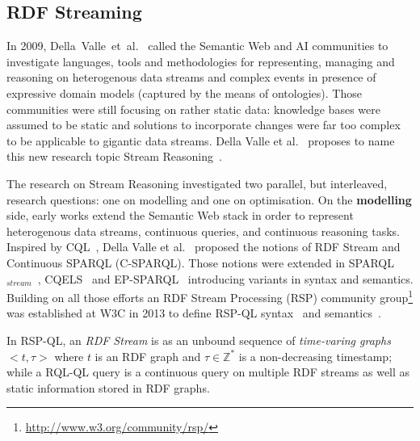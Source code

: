 \subsection{RDF Streaming}\label{sec:rdf} %


In 2009, Della~Valle~et~al.~\cite{DBLP:journals/expert/ValleCHF09} called the Semantic Web and AI communities to investigate languages, tools and methodologies for representing, managing and reasoning on heterogenous data streams and complex events in presence of expressive domain models (captured by the means of ontologies). Those communities were still focusing on rather static data: knowledge bases were assumed to be static and solutions to incorporate changes were far too complex to be applicable to gigantic data streams. Della Valle et al.~\cite{DBLP:journals/expert/ValleCHF09} proposes to name this new research topic Stream Reasoning~\cite{DellAglioDataScience2017}.

\sloppy The research on Stream Reasoning investigated two parallel, but interleaved, research questions: one on modelling and one on optimisation. On the \textbf{modelling} side, early works extend the Semantic Web stack \cite{DBLP:books/daglib/0036180} in order to represent heterogenous data streams, continuous queries, and continuous reasoning tasks. Inspired by CQL~\cite{arasu_widom_2004}, Della Valle et al.~\cite{DBLP:conf/fis/ValleCBBC08} proposed the notions of RDF Stream and Continuous SPARQL (C-SPARQL). Those notions were extended in SPARQL$_{stream}$~\cite{Calbimonte2010}, CQELS~\cite{LePhuoc2012c} and EP-SPARQL~\cite{DBLP:journals/semweb/AnicicRFS12} introducing variants in syntax and semantics. Building on all those efforts an RDF Stream Processing (RSP) community group\footnote{\url{http://www.w3.org/community/rsp/}} was established at W3C in 2013  to define RSP-QL syntax~\cite{DBLP:conf/esws/DellAglioCVC15} and semantics~\cite{DBLP:journals/ijswis/DellAglioVCC14}.

In RSP-QL, an \textit{RDF Stream} is as an unbound sequence of \emph{time-varing graphs} $< t,\tau>$ where $t$ is an RDF graph and $\tau \in \mathbb{Z}^{*}$ is a non-decreasing timestamp; while a RQL-QL query is a continuous query on multiple RDF streams as well as static information stored in RDF graphs. 

